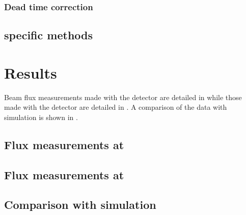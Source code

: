 \subsubsection{Dead time correction}
\label{sec:hptpc_beam_flux:methods:s3:deadtime}


\subsection{\SFour specific methods}
\label{sec:hptpc_beam_flux:methods:s4}

\section{Results}
\label{sec:hptpc_beam_flux:results}

Beam flux measurements made with the \SThree detector are detailed in  while those made with the \SFour detector are detailed in .
A comparison of the data with simulation is shown in .

\subsection{Flux measurements at \SThree}
\label{sec:hptpc_beam_flux:results:s3}

\subsection{Flux measurements at \SFour}
\label{sec:hptpc_beam_flux:results:s4}

\subsection{Comparison with simulation}
\label{sec:hptpc_beam_flux:results:MCData}

\begin{figure}[h]
  \begin{adjustbox}{max totalsize=.7\textwidth, center}
    
  \end{adjustbox}
  \caption[]{}
  \label{fig:tofS4Sim}
\end{figure}

